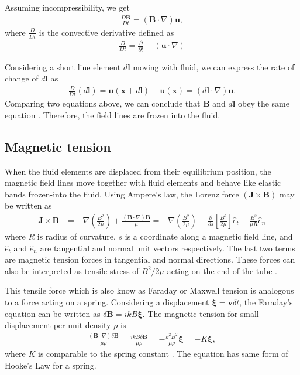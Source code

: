 \documentclass{jfm}
\newcommand{\del}{\nabla}
\begin{document}
Assuming incompressibility, we get
\begin{align}
    \frac{D \mathbf{B}}{D t} = (\mathbf{B}\cdot \del) \mathbf{u},
\end{align}
where $\frac{D}{Dt}$ is the convective derivative defined as
\begin{align}
    \frac{D}{Dt} = \frac{\partial}{\partial t} + (\mathbf{u} \cdot \del)
\end{align}

Considering a short line element $d\mathbf{l}$ moving with fluid, we can express 
the rate of change of $d\mathbf{l}$ as
\begin{align}
    \frac{D}{Dt}\left(d\mathbf{l}\right) = \mathbf{u}(\mathbf{x}+d\mathbf{l})-\mathbf{u}(\mathbf{x})=(d\mathbf{l}\cdot\del)\mathbf{u}.
\end{align}
Comparing two equations above, we can conclude that $\mathbf{B}$ and 
$d\mathbf{l}$ obey the same equation \cite[see][]{Davidson2001}. Therefore, the 
field lines are frozen into the fluid.


%
%
\subsection{Magnetic tension}

When the fluid elements are displaced from their equilibrium position, the 
magnetic field lines move together with fluid elements and behave like elastic
bands frozen-into the fluid. Using Ampere's law, the Lorenz force 
$(\mathbf{J}\times\mathbf{B})$ may be written as
\begin{align}
    \mathbf{J}\times\mathbf{B} &= - \del\left(\frac{B^2}{2\mu}\right) +\frac{(\mathbf{B}\cdot \del)\mathbf{B}}{\mu}
    =- \del\left(\frac{B^2}{2\mu}\right)+\frac{\partial}{\partial s} \left[\frac{B^2}{2\mu}\right]\hat{e}_t - \frac{B^2}{\mu R}\hat{e}_n
\end{align} 
where $R$ is radius of curvature, $s$ is a coordinate along a magnetic 
field line, and $\hat{e}_t$ and $\hat{e}_n$ are tangential and normal unit vectors 
respectively. The last two terms are magnetic tension forces in tangential and 
normal directions. These forces can also be interpreted as tensile stress of 
$B^2/2\mu$ acting on the end of the tube \cite[see][]{Davidson2001}. 

This tensile force which is also know as Faraday or Maxwell tension is 
analogous to a force acting on a spring. Considering a displacement 
$\boldsymbol{\xi}=\mathbf{v}\delta t$, the Faraday's equation can be written 
as $\delta \mathbf{B} = ikB\boldsymbol{\xi}$. The magnetic tension for small 
displacement per unit density $\rho$ is
\begin{align}
    \frac{(\mathbf{B}\cdot\del)\delta \mathbf{B}}{\mu \rho}=\frac{ikB\delta \mathbf{B}}{\mu \rho} = -\frac{k^2 B^2}{\mu\rho} \boldsymbol{\xi} = -K \boldsymbol{\xi},
\end{align}
where $K$ is comparable to the spring constant \cite[see][]{Wiki:MRI,Balbus1998}. The 
equation has same form of Hooke's Law for a spring.
\end{document}
